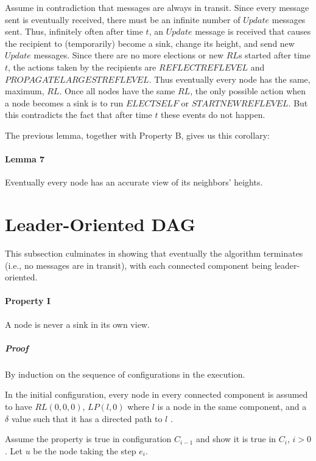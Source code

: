 Assume in contradiction that messages are always in transit. Since every message sent is eventually received, there must be an infinite number of $Update$ messages sent. Thus, infinitely often after time $t$, an $Update$ message is received that causes the recipient to (temporarily) become a sink, change its height, and send new $Update$ messages. Since there are no more elections or new $RL$s started after time $t$, the actions taken by the recipients are $REFLECTREFLEVEL$ and $PROPAGATELARGESTREFLEVEL$. Thus eventually every node has the same, maximum, $RL$. Once all nodes have the same $RL$, the only possible action when a node becomes a sink is to run $ELECTSELF$ or $STARTNEWREFLEVEL$. But this contradicts the fact that after time $t$ these events do not happen.

The previous lemma, together with Property B, gives us this corollary:

\paragraph{Lemma 7}Eventually every node has an accurate view of its neighbors’ heights.
\section{Leader-Oriented DAG}
This subsection culminates in showing that eventually the algorithm terminates (i.e., no messages are in transit), with each connected component being leader-oriented.

\paragraph{Property I} A node is never a sink in its own view.
\subparagraph{Proof}By induction on the sequence of configurations in the execution.

In the initial configuration, every node in every connected component is assumed to have $RL(0,0,0)$, $LP (l, 0)$ where $l$ is a node in the same component, and a $\delta$ value such that it has a directed path to $l$	.

Assume the property is true in configuration $C_{i-1}$ and show it is true in $C_i$, $i > 0$. Let $u$ be the node taking the step $e_i$.

